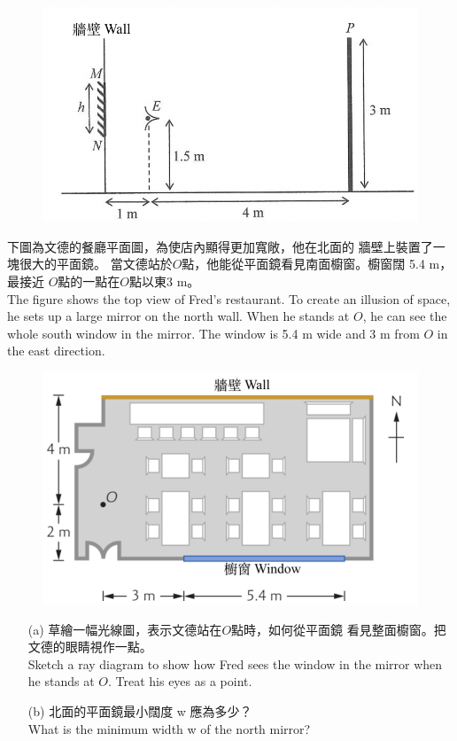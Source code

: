 \documentclass[beamer=true]{standalone}
\begin{document}
\begin{eg}
    \begin{figure}
        \centering
        \includegraphics[width=0.5\linewidth]{assets/dwddd89u2j38d2.png}
    \end{figure}
\end{eg}

\begin{eg}
    下圖為文德的餐廳平面圖，為使店內顯得更加寬敞，他在北面的 牆壁上裝置了一塊很大的平面鏡。 當文德站於$O$點，他能從平面鏡看見南面櫥窗。櫥窗闊 5.4 m， 最接近 $O$點的一點在$O$點以東3 m。\\The figure shows the top view of Fred's restaurant. To create an illusion of space, he sets up a large mirror on the north wall. When he stands at $O$, he can see the whole south window in the mirror. The window is 5.4 m wide and 3 m from $O$ in the east direction.
    \begin{figure}
        \centering
        \includegraphics[width=0.5\linewidth]{assets/duq9d8qwdage.png}
    \end{figure}
\end{eg}

\begin{eg}
    \begin{itemize}
        \item [(a)] 草繪一幅光線圖，表示文德站在$O$點時，如何從平面鏡 看見整面櫥窗。把文德的眼睛視作一點。\\Sketch a ray diagram to show how Fred sees the window in the mirror when he stands at $O$. Treat his eyes as a point.
    \end{itemize}
\end{eg}

\begin{eg}
    \begin{itemize}
        \item [(b)] 北面的平面鏡最小闊度 w 應為多少？\\What is the minimum width w of the north mirror?
    \end{itemize}
\end{eg}
\end{document}
